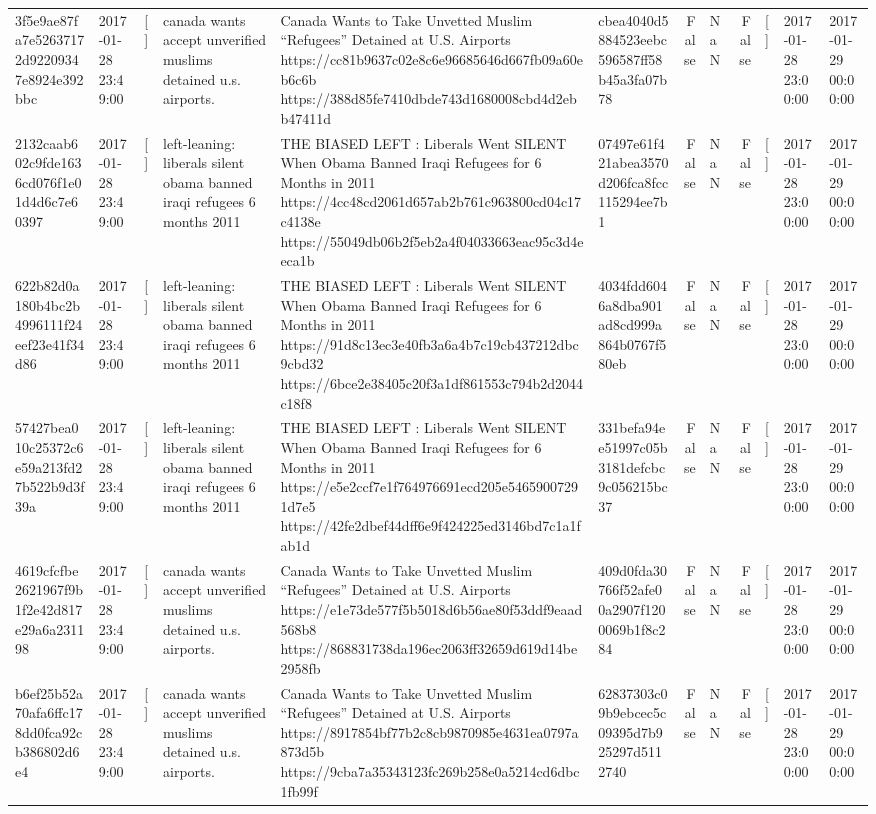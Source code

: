 \begin{tabular}{llllllrlrlll}
3f5e9ae87fa7e52637172d92209347e8924e392bbc & 2017-01-28 23:49:00 & [] & canada wants accept unverified muslims detained u.s. airports. & Canada Wants to Take Unvetted Muslim “Refugees” Detained at U.S. Airports https://cc81b9637c02e8c6e96685646d667fb09a60eb6c6b https://388d85fe7410dbde743d1680008cbd4d2ebb47411d & cbea4040d5884523eebc596587ff58b45a3fa07b78 & False & NaN & False & [] & 2017-01-28 23:00:00 & 2017-01-29 00:00:00 \\
2132caab602c9fde1636cd076f1e01d4d6c7e60397 & 2017-01-28 23:49:00 & [] & left-leaning: liberals silent obama banned iraqi refugees 6 months 2011 & THE BIASED LEFT : Liberals Went SILENT When Obama Banned Iraqi Refugees for 6 Months in 2011 https://4cc48cd2061d657ab2b761c963800cd04c17c4138e https://55049db06b2f5eb2a4f04033663eac95c3d4eeca1b & 07497e61f421abea3570d206fca8fcc115294ee7b1 & False & NaN & False & [] & 2017-01-28 23:00:00 & 2017-01-29 00:00:00 \\
622b82d0a180b4bc2b4996111f24eef23e41f34d86 & 2017-01-28 23:49:00 & [] & left-leaning: liberals silent obama banned iraqi refugees 6 months 2011 & THE BIASED LEFT : Liberals Went SILENT When Obama Banned Iraqi Refugees for 6 Months in 2011 https://91d8c13ec3e40fb3a6a4b7c19cb437212dbc9cbd32 https://6bce2e38405c20f3a1df861553c794b2d2044c18f8 & 4034fdd6046a8dba901ad8cd999a864b0767f580eb & False & NaN & False & [] & 2017-01-28 23:00:00 & 2017-01-29 00:00:00 \\
57427bea010c25372c6e59a213fd27b522b9d3f39a & 2017-01-28 23:49:00 & [] & left-leaning: liberals silent obama banned iraqi refugees 6 months 2011 & THE BIASED LEFT : Liberals Went SILENT When Obama Banned Iraqi Refugees for 6 Months in 2011 https://e5e2ccf7e1f764976691ecd205e54659007291d7e5 https://42fe2dbef44dff6e9f424225ed3146bd7c1a1fab1d & 331befa94ee51997c05b3181defcbc9c056215bc37 & False & NaN & False & [] & 2017-01-28 23:00:00 & 2017-01-29 00:00:00 \\
4619cfcfbe2621967f9b1f2e42d817e29a6a231198 & 2017-01-28 23:49:00 & [] & canada wants accept unverified muslims detained u.s. airports. & Canada Wants to Take Unvetted Muslim “Refugees” Detained at U.S. Airports https://e1e73de577f5b5018d6b56ae80f53ddf9eaad568b8 https://868831738da196ec2063ff32659d619d14be2958fb & 409d0fda30766f52afe00a2907f1200069b1f8c284 & False & NaN & False & [] & 2017-01-28 23:00:00 & 2017-01-29 00:00:00 \\
b6ef25b52a70afa6ffc178dd0fca92cb386802d6e4 & 2017-01-28 23:49:00 & [] & canada wants accept unverified muslims detained u.s. airports. & Canada Wants to Take Unvetted Muslim “Refugees” Detained at U.S. Airports https://8917854bf77b2c8cb9870985e4631ea0797a873d5b https://9cba7a35343123fc269b258e0a5214cd6dbc1fb99f & 62837303c09b9ebcec5c09395d7b925297d5112740 & False & NaN & False & [] & 2017-01-28 23:00:00 & 2017-01-29 00:00:00 \\

\end{tabular}
